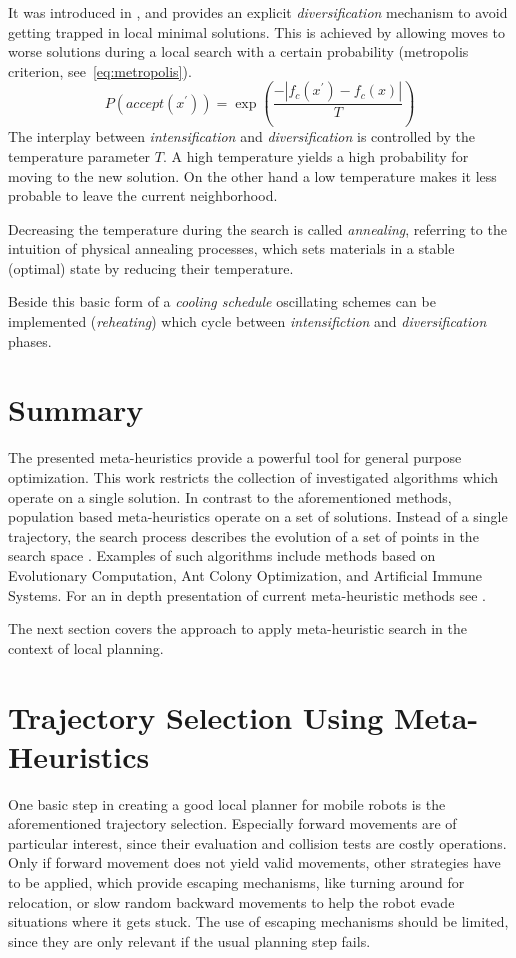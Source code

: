 It was introduced in \cite{Kirkpatrick83SimulatedAnnealing}, and provides an explicit \emph{diversification} mechanism to avoid getting trapped in local minimal solutions. 
This is achieved by allowing moves to worse solutions during a local search with a certain probability (metropolis criterion, see~\ref{eq:metropolis}).
\begin{equation}
   P(accept(x^\prime))=\exp{(\frac{-|f_c(x^\prime)-f_c(x)|}{T})}
   \label{eq:metropolis}
\end{equation} 
The interplay between \emph{intensification} and \emph{diversification} is controlled by the temperature  parameter $T$. A high temperature yields a high probability for moving to the new solution. On the other hand a low temperature makes it less probable to leave the current neighborhood.

Decreasing the temperature during the search is called \emph{annealing}, referring to the intuition of physical annealing processes, which sets materials in a stable (optimal) state by reducing their temperature. 

Beside this basic form of a \emph{cooling schedule} oscillating schemes can be implemented (\emph{reheating}) which cycle between \emph{intensifiction} and \emph{diversification} phases. 

\section{Summary}
The presented meta-heuristics provide a powerful tool for general purpose optimization. 
This work restricts the collection of investigated algorithms which operate on a single solution.
In contrast to the aforementioned methods, population based meta-heuristics operate on a set of solutions. Instead of a single trajectory, the search process describes \grqq the evolution of a set of points in the search space \grqq \cite{blum2003metaheuristics}.  
Examples of such algorithms include methods based on Evolutionary Computation, Ant Colony Optimization, and Artificial Immune Systems.
For an in depth presentation of current meta-heuristic methods see \cite{Gendreau2010}.

The next section covers the approach to apply meta-heuristic search in the context of local planning.

\clearpage
\section{Trajectory Selection Using Meta-Heuristics} \label{sec:trajselmeta}
One basic step in creating a good local planner for mobile robots is the aforementioned trajectory selection. Especially forward movements are of particular interest, since their evaluation and collision tests are costly operations.
Only if forward movement does not yield valid movements, other strategies have to be applied, which provide escaping mechanisms, like turning around for relocation, or slow random backward movements to help the robot evade situations where it gets stuck. 
The use of escaping mechanisms should be limited, since they are only relevant if the usual planning step fails. 

